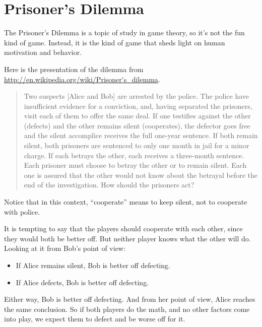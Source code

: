 \documentclass[10pt]{book}
\begin{document}
\section{Prisoner's Dilemma}
\label{prisoners}

The Prisoner's Dilemma is a topic of study in game theory, so
it's not the fun kind of game.  Instead, it is the kind of game
that sheds light on human motivation and behavior.

Here is the presentation of the dilemma from
\url{http://en.wikipedia.org/wiki/Prisoner's_dilemma}.

\begin{quote}
Two suspects [Alice and Bob] are arrested by the police.  The police
have insufficient evidence for a conviction, and, having separated the
prisoners, visit each of them to offer the same deal.  If one
testifies against the other (defects) and the
other remains silent (cooperates), the defector goes free and the
silent accomplice receives the full one-year sentence.  If both remain
silent, both prisoners are sentenced to only one month in jail for a
minor charge. If each betrays the other, each receives a three-month
sentence. Each prisoner must choose to betray the other or to remain
silent. Each one is assured that the other would not know about the
betrayal before the end of the investigation.  How should the
prisoners act?
\end{quote}

Notice that in this context, ``cooperate'' means to keep silent,
not to cooperate with police.

It is tempting to say that the players should cooperate with each
other, since they would both be better off.  But neither player knows
what the other will do.  Looking at it from Bob's point of view:

\begin{itemize}

\item If Alice remains silent, Bob is better off defecting.

\item If Alice defects, Bob is better off defecting.

\end{itemize}

Either way, Bob is better off defecting.  And from her point of view,
Alice reaches the same conclusion.  So if both players do the math,
and no other factors come into play, we expect them to defect and be
worse off for it.
\end{document}
